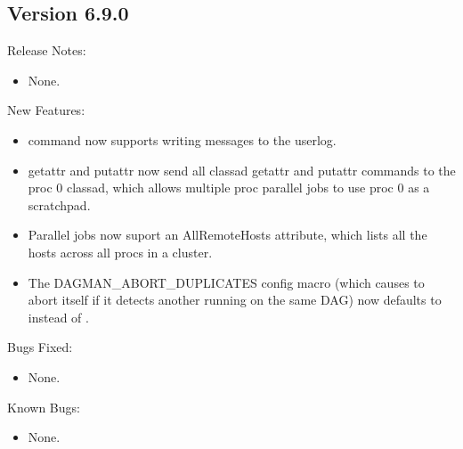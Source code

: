 \subsection*{\label{sec:New-6-9-0}Version 6.9.0}

\noindent Release Notes:

\begin{itemize}

\item None.

\end{itemize}


\noindent New Features:

\begin{itemize}

\item {} command now supports writing messages to the userlog.

\item {} getattr and putattr now send all classad getattr and putattr
commands to the proc 0 classad, which allows multiple proc parallel jobs to
use proc 0 as a scratchpad.

\item Parallel jobs now suport an AllRemoteHosts attribute, which lists all the
hosts across all procs in a cluster.

\item The DAGMAN\_ABORT\_DUPLICATES config macro (which causes
 to abort itself if it detects another 
running on the same DAG) now defaults to  instead of
.

\end{itemize}

\noindent Bugs Fixed:

\begin{itemize}

\item None.

\end{itemize}

\noindent Known Bugs:

\begin{itemize}

\item None.

\end{itemize}

